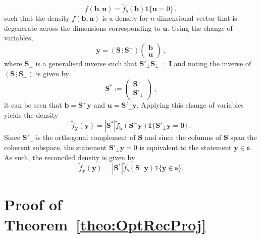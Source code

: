 \documentclass[11pt]{article}
\theoremstyle{definition}
\begin{document}
\begin{equation}
f(\bm{b},\bm{u})=\tilde{f}_b(\bm{b})\mathbb{1}\{\bm{u}=0\}\,,
\end{equation}
such that the density $f(\bm{b},\bm{u})$ is a density for $n$-dimensional vector that is degenerate across the dimensions corresponding to $\bm{u}$. Using the change of variables,
\[
\bm{y}=\left(\bm{S}\,\vdots\,\bm{S}^-_{\perp}\right)\begin{pmatrix}\bm{b}\\\bm{u}
\end{pmatrix}\,,
\]
where $\bm{S}^-_{\perp}$ is a generalised inverse such that $\bm{S}'_{\perp}\bm{S}^-_{\perp}=\bm{I}$ and noting the inverse of $\left(\bm{S}\,\vdots\,\bm{S}_{\perp}\right)$ is given by
\[
\bm{S}^*:=\begin{pmatrix}\bm{S}^{-}\\\bm{S}'_{\perp}\end{pmatrix}\,,
\]
it can be seen that $\bm{b}=\bm{S}^-\bm{y}$ and $\bm{u}=\bm{S}'_\perp\bm{y}$. Applying this change of variables yields the density
\[
\tilde{f}_{\bm{y}}(\bm{y})=|\bm{S}^*|\tilde{f}_{\bm{b}}(\bm{S}^-\bm{y})\mathbb{1}\{\bm{S}'_\perp\bm{y}=\bm{0}\}\,.
\]
Since $\bm{S}'_\perp$ is the orthogonal complement of $\bm{S}$ and since the columns of $\bm{S}$ span the coherent subspace, the statement $\bm{S}'_\perp\bm{y}=0$ is equivalent to the statement $\bm{y}\in\mathfrak{s}$. As such, the reconciled density is given by
\[
\tilde{f}_{\bm{y}}(\bm{y})=|\bm{S}^*|\tilde{f}_b(\bm{S}^-\bm{y})\mathbb{1}\{\bm{y}\in\mathfrak{s}\}.
\]
\clearpage
\section{Proof of Theorem~\ref{theo:OptRecProj}}
\label{app:OptRecProj}
\end{document}
